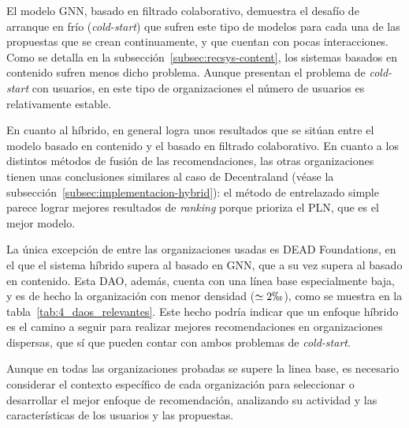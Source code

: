 El modelo GNN, basado en filtrado colaborativo, demuestra el desafío de arranque en frío (\textit{cold-start}) que sufren este tipo de modelos para cada una de las propuestas que se crean continuamente, y que cuentan con pocas interacciones. Como se detalla en la subsección~\ref{subsec:recsys-content}, los sistemas basados en contenido sufren menos dicho problema. Aunque presentan el problema de \textit{cold-start} con usuarios, en este tipo de organizaciones el número de usuarios es relativamente estable.

En cuanto al híbrido, en general logra unos resultados que se sitúan entre el modelo basado en contenido y el basado en filtrado colaborativo. En cuanto a los distintos métodos de fusión de las recomendaciones, las otras organizaciones tienen unas conclusiones similares al caso de Decentraland (véase la subsección~\ref{subsec:implementacion-hybrid}): el método de entrelazado simple parece lograr mejores resultados de \textit{ranking} porque prioriza el PLN, que es el mejor modelo.

La única excepción de entre las organizaciones usadas es DEAD Foundations, en el que el sistema híbrido supera al basado en GNN, que a su vez supera al basado en contenido. 
Esta DAO, además, cuenta con una línea base especialmente baja, y es de hecho la organización con menor densidad ($\simeq2\permil$), como se muestra en la tabla~\ref{tab:4_daos_relevantes}. Este hecho podría indicar que un enfoque híbrido es el camino a seguir para realizar mejores recomendaciones en organizaciones dispersas, que sí que pueden contar con ambos problemas de \textit{cold-start}.

Aunque en todas las organizaciones probadas se supere la linea base, es necesario considerar el contexto específico de cada organización para seleccionar o desarrollar el mejor enfoque de recomendación, analizando su actividad y las características de los usuarios y las propuestas. 
